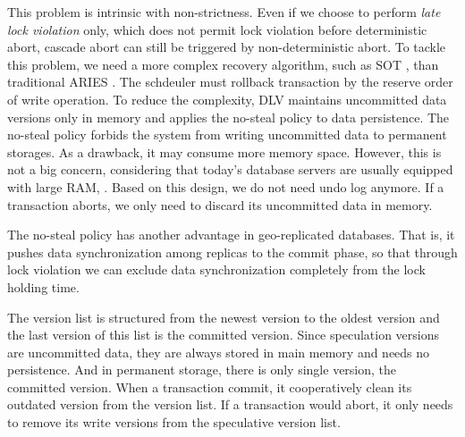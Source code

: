 \documentclass[conference]{IEEEtran}
\begin{document}
This problem is intrinsic with non-strictness.
Even if we choose to perform \emph{late lock violation} only, which does not permit lock violation before deterministic abort,
cascade abort can still be triggered by non-deterministic abort.
To tackle this problem, we need a more complex recovery algorithm, such as SOT \cite{UnifyCR:journals/is/AlonsoVABASW94},
than traditional ARIES \cite{ARIES:journals/tods/MohanHLPS92}.
The schdeuler must rollback transaction by the reserve order of write operation.
To reduce the complexity, DLV maintains uncommitted data versions only in memory and applies the no-steal policy to data persistence.
The no-steal policy forbids the system from writing uncommitted data to permanent storages.
As a drawback, it may consume more memory space.
However, this is not a big concern, considering that today's database servers are usually equipped with large RAM, .
Based on this design, we do not need undo log anymore. If a transaction aborts, we only need to discard its uncommitted data in memory.

The no-steal policy has another advantage in geo-replicated databases. That is, it pushes data synchronization among replicas to the commit phase,
so that through lock violation we can exclude data synchronization completely from the lock holding time. %

The version list is structured from the newest version to the oldest version and the last version of this list is the committed version.
Since speculation versions are uncommitted data, they are always stored in main memory and needs no persistence.
And in permanent storage, there is only single version, the committed version.
When a transaction commit, it cooperatively clean its outdated version from the version list. 
If a transaction would abort, it only needs to remove its write versions from the speculative version list.
\end{document}
